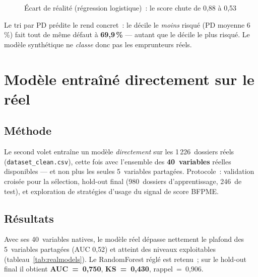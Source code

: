 \documentclass[a4paper,11pt]{report}
\newcommand{\aucbar}[4]{%
  \node[anchor=east, font=\small] at (0,#1) {#2};
  \draw[fill=LightGray, draw=MidGray] (0.2,{#1-0.2}) rectangle (6.2,{#1+0.2});
  \draw[fill=#4, draw=#4] (0.2,{#1-0.2}) rectangle ({0.2+6.0*#3},{#1+0.2});
  \node[anchor=west, font=\small\bfseries] at (6.35,#1) {#3};
}
\begin{document}
\begin{figure}[H]
\centering
{}
\caption{Écart de réalité (régression logistique)~: le score chute de 0{,}88 à 0{,}53}
\label{fig:threeworlds}
\end{figure}

Le tri par PD prédite le rend concret~: le décile le \emph{moins} risqué (PD moyenne 6\,\%)
fait tout de même défaut à \textbf{69,9\,\%} — autant que le décile le plus risqué. Le modèle
synthétique ne \emph{classe} donc pas les emprunteurs réels.

\section{Modèle entraîné directement sur le réel}

\subsection{Méthode}

Le second volet entraîne un modèle \emph{directement} sur les 1\,226~dossiers réels
(\texttt{dataset\_clean.csv}), cette fois avec l'ensemble des \textbf{40~variables} réelles
disponibles — et non plus les seules 5~variables partagées. Protocole~: validation croisée pour
la sélection, hold-out final (980~dossiers d'apprentissage, 246~de test), et exploration de
stratégies d'usage du signal de score BFPME.

\subsection{Résultats}

Avec ses 40~variables natives, le modèle réel dépasse nettement le plafond des 5~variables
partagées (AUC 0{,}52) et atteint des niveaux exploitables (tableau~\ref{tab:realmodels}). Le
RandomForest réglé est retenu~; sur le hold-out final il obtient
\textbf{AUC~=~0{,}750}, \textbf{KS~=~0{,}430}, rappel~=~0{,}906.
\end{document}
